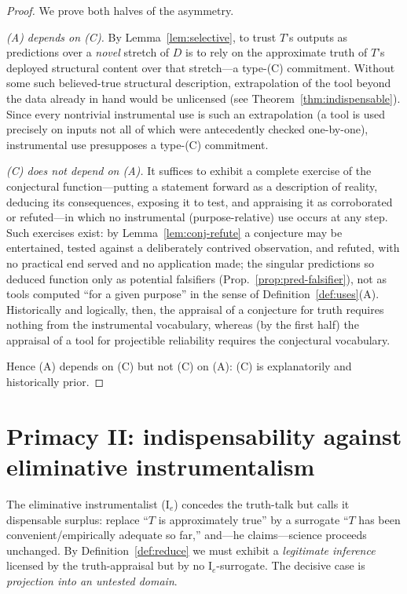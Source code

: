 \documentclass{amsart}
\theoremstyle{definition}
\theoremstyle{plain}
\begin{document}
\begin{proof}
We prove both halves of the asymmetry.

\emph{(A) depends on (C).} By Lemma~\ref{lem:selective}, to trust $T$'s outputs
as predictions over a \emph{novel} stretch of $D$ is to rely on the approximate
truth of $T$'s deployed structural content over that stretch---a type-(C)
commitment. Without some such believed-true structural description,
extrapolation of the tool beyond the data already in hand would be unlicensed
(see Theorem~\ref{thm:indispensable}). Since every nontrivial instrumental use
is such an extrapolation (a tool is used precisely on inputs not all of which
were antecedently checked one-by-one), instrumental use presupposes a type-(C)
commitment.

\emph{(C) does not depend on (A).} It suffices to exhibit a complete exercise of
the conjectural function---putting a statement forward as a description of
reality, deducing its consequences, exposing it to test, and appraising it as
corroborated or refuted---in which no instrumental (purpose-relative) use occurs
at any step. Such exercises exist: by Lemma~\ref{lem:conj-refute} a conjecture
may be entertained, tested against a deliberately contrived observation, and
refuted, with no practical end served and no application made; the singular
predictions so deduced function only as potential falsifiers
(Prop.~\ref{prop:pred-falsifier}), not as tools computed ``for a given
purpose'' in the sense of Definition~\ref{def:uses}(A). Historically and
logically, then, the appraisal of a conjecture for truth requires nothing from
the instrumental vocabulary, whereas (by the first half) the appraisal of a tool
for projectible reliability requires the conjectural vocabulary.

Hence (A) depends on (C) but not (C) on (A): (C) is explanatorily and
historically prior.
\end{proof}

\section{Primacy II: indispensability against eliminative instrumentalism}

The eliminative instrumentalist ($\mathrm I_e$) concedes the truth-talk but
calls it dispensable surplus: replace ``$T$ is approximately true'' by a
surrogate ``$T$ has been convenient/empirically adequate so far,'' and---he
claims---science proceeds unchanged. By Definition~\ref{def:reduce} we must
exhibit a \emph{legitimate inference} licensed by the truth-appraisal but by no
$\mathrm I_e$-surrogate. The decisive case is \emph{projection into an untested
domain}.
\end{document}
